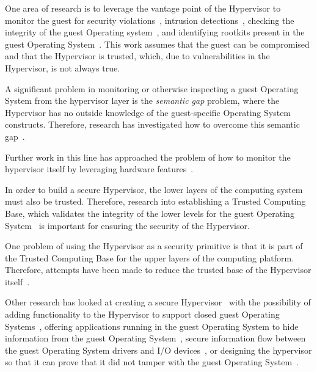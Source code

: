 \documentclass[11pt,letterpaper]{article}
\begin{document}
One area of research is to leverage the vantage point of the
Hypervisor to monitor the guest for security
violations~\cite{Karger1991, Barham2003}, intrusion
detections~\cite{Dunlap2002, Garfinkel2003a, Kourai2005, Chen2008,
  Garfinkel2003b}, checking the integrity of the guest Operating
system~\cite{Seshadri2006, McCune2010}, and identifying rootkits present
in the guest Operating System~\cite{Jones2008, Grace2010}. This work
assumes that the guest can be compromised and that the Hypervisor is
trusted, which, due to vulnerabilities in the Hypervisor, is not
always true.

A significant problem in monitoring or otherwise inspecting a guest
Operating System from the hypervisor layer is the \emph{semantic gap}
problem, where the Hypervisor has no outside knowledge of the
guest-specific Operating System constructs. Therefore, research has
investigated how to overcome this semantic gap~\cite{Jones2006,
  Christodorescu2009, Srinivasan2011}.

Further work in this line has approached the problem of how to monitor
the hypervisor itself by leveraging hardware features~\cite{Azab2010}.

In order to build a secure Hypervisor, the lower layers of the
computing system must also be trusted. Therefore, research into
establishing a Trusted Computing Base, which validates the integrity
of the lower levels for the guest Operating System~\cite{Arbaugh1997,
  Sailer2004, Singaravelu2006} is important for ensuring the security
of the Hypervisor.

One problem of using the Hypervisor as a security primitive is that it
is part of the Trusted Computing Base for the upper layers of the
computing platform. Therefore, attempts have been made to reduce the
trusted base of the Hypervisor itself~\cite{Murray2008, Shinagawa2009,
  Colp2011, Wang2012}.

Other research has looked at creating a secure
Hypervisor~\cite{Robin2000, Belay2012, Szefer2011, Vasudevan2013} with
the possibility of adding functionality to the Hypervisor to support
closed guest Operating Systems~\cite{Garfinkel2003}, offering
applications running in the guest Operating System to hide information
from the guest Operating System~\cite{Chen2008, Yang2008, Jin2011,
  Szefer2012, Azab2011, Zhang2011, Jin2011a, Szefer2011a}, secure
information flow between the guest Operating System drivers and I/O
devices~\cite{Cheng2013}, or designing the hypervisor so that it can
prove that it did not tamper with the guest Operating
System~\cite{Gu2011}.
\end{document}
